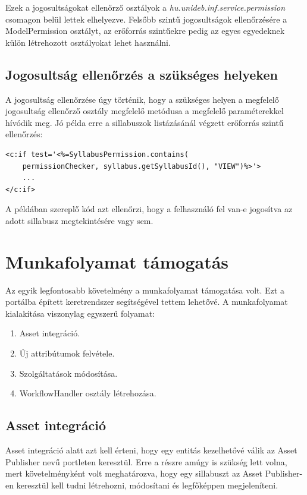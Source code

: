 \documentclass[hidelinks, 12pt, a4paper]{report}
\begin{document}
Ezek a jogosultságokat ellenőrző osztályok a \emph{hu.unideb.inf.service.permission} csomagon belül lettek elhelyezve. Felsőbb szintű jogosultságok ellenőrzésére a ModelPermission osztályt, az erőforrás szintűekre pedig az egyes egyedeknek külön létrehozott osztályokat lehet használni.

\subsection{Jogosultság ellenőrzés a szükséges helyeken}

A jogosultság ellenőrzése úgy történik, hogy a szükséges helyen a megfelelő jogosultság ellenőrző osztály megfelelő metódusa a megfelelő paraméterekkel hívódik meg. Jó példa erre a sillabuszok listázásánál végzett erőforrás szintű ellenőrzés:

\begin{lstlisting}[style=customxml]
<c:if test='<%=SyllabusPermission.contains(
	permissionChecker, syllabus.getSyllabusId(), "VIEW")%>'>
	...
</c:if>
\end{lstlisting}

\noindent A példában szereplő kód azt ellenőrzi, hogy a felhasználó fel van-e jogosítva az adott sillabusz megtekintésére vagy sem.

\section{Munkafolyamat támogatás}

Az egyik legfontosabb követelmény a munkafolyamat támogatása volt. Ezt a portálba épített keretrendszer segítségével tettem lehetővé. A munkafolyamat kialakítása viszonylag egyszerű folyamat:
\begin{enumerate}
\item Asset integráció.
\item Új attribútumok felvétele.
\item Szolgáltatások módosítása.
\item WorkflowHandler osztály létrehozása.
\end{enumerate}

\subsection{Asset integráció}

Asset integráció alatt azt kell érteni, hogy egy entitás kezelhetővé válik az Asset Publisher nevű portleten keresztül. Erre a részre amúgy is szükség lett volna, mert követelményként volt meghatározva, hogy egy sillabuszt az Asset Publisher-en keresztül kell tudni létrehozni, módosítani és legfőképpen megjeleníteni.
\end{document}
